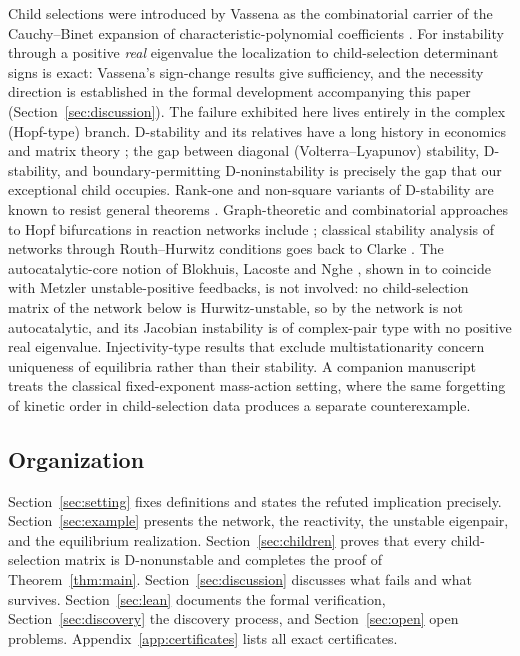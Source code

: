 \documentclass[11pt,a4paper]{article}
\theoremstyle{definition}
\theoremstyle{remark}
\begin{document}
Child selections were introduced by Vassena as the combinatorial carrier of the Cauchy--Binet expansion of characteristic-polynomial coefficients \cite{Vassena2023Symbolic,Vassena2023SaddleNode}. For instability through a positive \emph{real} eigenvalue the localization to child-selection determinant signs is exact: Vassena's sign-change results give sufficiency, and the necessity direction is established in the formal development accompanying this paper (Section~\ref{sec:discussion}). The failure exhibited here lives entirely in the complex (Hopf-type) branch. D-stability and its relatives have a long history in economics and matrix theory \cite{ArrowMcManus1958,Johnson1974,Cross1978,Hershkowitz1992,Kushel2019}; the gap between diagonal (Volterra--Lyapunov) stability, D-stability, and boundary-permitting D-noninstability is precisely the gap that our exceptional child occupies. Rank-one and non-square variants of D-stability are known to resist general theorems \cite{BierkensRan2014,Su2024}. Graph-theoretic and combinatorial approaches to Hopf bifurcations in reaction networks include \cite{MinchevaRoussel2007,AngeliBanajiPantea2014}; classical stability analysis of networks through Routh--Hurwitz conditions goes back to Clarke \cite{Clarke1980}. The autocatalytic-core notion of Blokhuis, Lacoste and Nghe \cite{BlokhuisLacosteNghe2020}, shown in \cite{VassenaStadler2024} to coincide with Metzler unstable-positive feedbacks, is not involved: no child-selection matrix of the network below is Hurwitz-unstable, so by \cite[Cor.~26]{VassenaStadler2024} the network is not autocatalytic, and its Jacobian instability is of complex-pair type with no positive real eigenvalue. Injectivity-type results that exclude multistationarity \cite{BanajiDonnellBaigent2007,BanajiCraciun2010,Feinberg2019} concern uniqueness of equilibria rather than their stability. A companion manuscript \cite{Companion2026} treats the classical fixed-exponent mass-action setting, where the same forgetting of kinetic order in child-selection data produces a separate counterexample.

\subsection*{Organization}

Section~\ref{sec:setting} fixes definitions and states the refuted implication precisely. Section~\ref{sec:example} presents the network, the reactivity, the unstable eigenpair, and the equilibrium realization. Section~\ref{sec:children} proves that every child-selection matrix is D-nonunstable and completes the proof of Theorem~\ref{thm:main}. Section~\ref{sec:discussion} discusses what fails and what survives. Section~\ref{sec:lean} documents the formal verification, Section~\ref{sec:discovery} the discovery process, and Section~\ref{sec:open} open problems. Appendix~\ref{app:certificates} lists all exact certificates.
\end{document}
